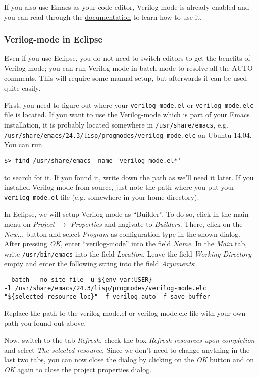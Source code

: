 If you also use Emacs as your code editor,
Verilog-mode is already enabled and you can read through the
\href{http://www.veripool.org/wiki/verilog-mode/Documentation}{documentation} to
learn how to use it.

\subsubsection{Verilog-mode in Eclipse}

Even if you use Eclipse, you do not need to switch editors to get the
benefits of Verilog-mode; you can run Verilog-mode in batch mode to
resolve all the AUTO comments. This will require some manual setup, but
afterwards it can be used quite easily.

First, you need to figure out where your \verb|verilog-mode.el| or
\verb|verilog-mode.elc| file is located. If you want to use the
Verilog-mode which is part of your Emacs installation, it is probably located
somewhere in \verb|/usr/share/emacs|, e.g.
\verb|/usr/share/emacs/24.3/lisp/progmodes/verilog-mode.elc| on Ubuntu 14.04.
You can run
\begin{lstlisting}
$> find /usr/share/emacs -name 'verilog-mode.el*'
\end{lstlisting}
to search for it. If you found it, write down the path as we'll need it later.
If you installed Verilog-mode from source, just note the path where you put
your \verb|verilog-mode.el| file (e.g. somewhere in your home directory).

In Eclipse, we will setup Verilog-mode as ``Builder''. To do so, click in the
main menu on \emph{Project $\rightarrow$ Properties} and nagivate to
\emph{Builders}. There, click on the \emph{New...} button and select
\emph{Program} as configuration type in the shown dialog. After pressing
\emph{OK}, enter ``verilog-mode'' into the field \emph{Name}. In the \emph{Main}
tab, write \verb|/usr/bin/emacs| into the field \emph{Location}. Leave the field
\emph{Working Directory} empty and enter the following string into the field
\emph{Arguments}:
\begin{lstlisting}
--batch --no-site-file -u ${env_var:USER}
-l /usr/share/emacs/24.3/lisp/progmodes/verilog-mode.elc
"${selected_resource_loc}" -f verilog-auto -f save-buffer
\end{lstlisting}

Replace the path to the verilog-mode.el or verilog-mode.elc file with your own
path you found out above.

Now, switch to the tab \emph{Refresh}, check the box \emph{Refresh resources
upon completion} and select \emph{The selected resource}. Since we don't need
to change anything in the last two tabs, you can now close the dialog by
clicking on the \emph{OK} button and on \emph{OK} again to close the project
properties dialog.

